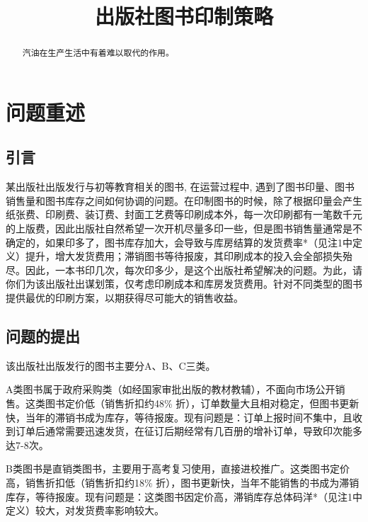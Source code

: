 \documentclass[bwprint]{gmcmthesis}
\title{出版社图书印制策略}
\begin{document}
 \maketitle

\begin{abstract}
汽油在生产生活中有着难以取代的作用。

\end{abstract}

\pagestyle{plain}


\section{问题重述}

\subsection{引言}

某出版社出版发行与初等教育相关的图书, 在运营过程中, 遇到了图书印量、图书销售量和图书库存之间如何协调的问题。在印制图书的时候，除了根据印量会产生纸张费、印刷费、装订费、封面工艺费等印刷成本外，每一次印刷都有一笔数千元的上版费，因此出版社自然希望一次开机尽量多印一些，但是图书销售量通常是不确定的，如果印多了，图书库存加大，会导致与库房结算的发货费率*（见注1中定义）提升，增大发货费用；滞销图书等待报废，其印刷成本的投入会全部损失殆尽。因此，一本书印几次，每次印多少，是这个出版社希望解决的问题。为此，请你们为该出版社出谋划策，仅考虑印刷成本和库房发货费用。针对不同类型的图书提供最优的印刷方案，以期获得尽可能大的销售收益。

\subsection{问题的提出}

该出版社出版发行的图书主要分A、B、C三类。

A类图书属于政府采购类（如经国家审批出版的教材教辅），不面向市场公开销售。这类图书定价低（销售折扣约48\% 折），订单数量大且相对稳定，但图书更新快，当年的滞销书成为库存，等待报废。现有问题是：订单上报时间不集中，且收到订单后通常需要迅速发货，在征订后期经常有几百册的增补订单，导致印次能多达7-8次。

B类图书是直销类图书，主要用于高考复习使用，直接进校推广。这类图书定价高，销售折扣低（销售折扣约18\% 折），图书更新快，当年不能销售的书成为滞销库存，等待报废。现有问题是：这类图书因定价高，滞销库存总体码洋*（见注1中定义）较大，对发货费率影响较大。
\end{document}
